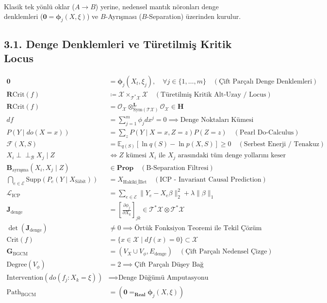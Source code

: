 \documentclass[11pt, a4paper]{article}
\begin{document}
Klasik tek yönlü oklar ($A \to B$) yerine, nedensel mantık nöronları denge denklemleri ($\mathbf{0} = \bm{\phi}_j(X, \xi)$) ve $B$-Ayrışması ($B$-Separation) üzerinden kurulur.

\subsection{3.1. Denge Denklemleri ve Türetilmiş Kritik Locus}
\begin{align}
\mathbf{0} &= \bm{\phi}_j(X_t, \xi_j), \quad \forall j \in \{1, \dots, m\} \quad (\text{Çift Parçalı Denge Denklemleri}) \\
\mathbf{R}\text{Crit}(f) &\coloneqq \mathcal{X} \times_{\mathcal{T}^*\mathcal{X}} \mathcal{X} \quad (\text{Türetilmiş Kritik Alt-Uzay / Locus}) \\
\mathbf{R}\text{Crit}(f) &= \mathcal{O}_{\mathcal{X}} \otimes_{\text{Sym}(\mathcal{T}\mathcal{X})}^{\mathbf{L}} \mathcal{O}_{\mathcal{X}} \in \mathbf{H} \\
df &= \sum_{j=1}^m \phi_j dx^j = 0 \implies \text{Denge Noktaları Kümesi} \\
P(Y \mid do(X = x)) &= \sum_z P(Y \mid X = x, Z = z) P(Z = z) \quad (\text{Pearl Do-Calculus}) \\
\mathcal{F}(X, S) &= \mathbb{E}_{q(S)} \left[ \ln q(S) - \ln p(X, S) \right] \ge 0 \quad (\text{Serbest Enerji / Tenakuz}) \\
X_i \perp\!\!\!\perp_{\mathcal{B}} X_j \mid Z &\iff Z \text{ kümesi } X_i \text{ ile } X_j \text{ arasındaki tüm denge yollarını keser} \\
\mathbf{B}_{\text{ayrışma}}(X_i, X_j \mid Z) &\in \mathbf{Prop} \quad (\text{B-Separation Filtresi}) \\
\bigcap_{e \in \mathcal{E}} \text{Supp}\left( P_e(Y \mid X_{\text{Sâbit}}) \right) &= X_{\text{Hakiki\_İllet}} \quad (\text{ICP - Invariant Causal Prediction}) \\
\mathcal{L}_{\text{ICP}} &= \sum_{e \in \mathcal{E}} \| Y_e - X_e \beta \|_2^2 + \lambda \|\beta\|_1 \\
\mathbf{J}_{\text{denge}} &= \left[ \frac{\partial \phi_j}{\partial X_k} \right]_{jk} \in \mathcal{T}^*\mathcal{X} \otimes \mathcal{T}^*\mathcal{X} \\
\det(\mathbf{J}_{\text{denge}}) &\ne 0 \implies \text{Örtük Fonksiyon Teoremi ile Tekil Çözüm} \\
\text{Crit}(f) &= \{ x \in \mathcal{X} \mid df(x) = 0 \} \subset \mathcal{X} \\
\mathbf{G}_{\text{BGCM}} &= (V_X \cup V_\phi, E_{\text{denge}}) \quad (\text{Çift Parçalı Nedensel Çizge}) \\
\text{Degree}(V_\phi) &= 2 \implies \text{Çift Parçalı Düşey Bağ} \\
\text{Intervention}(do(f_j : X_k = \xi)) &\implies \text{Denge Düğümü Amputasyonu} \\
\text{Path}_{\text{BGCM}} &= (\mathbf{0} =_{\mathbf{Real}} \bm{\phi}_j(X, \xi))
\end{align}
\end{document}
